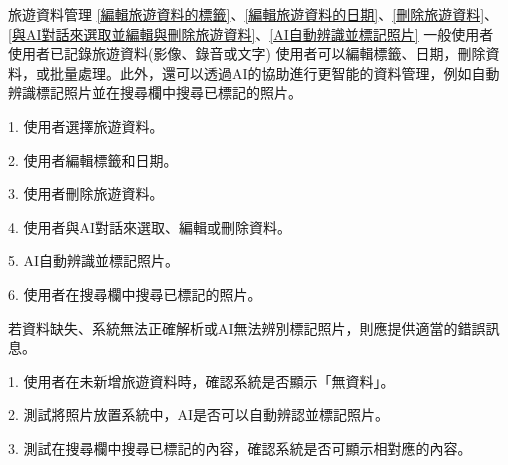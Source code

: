 \addUsecase
  {旅遊資料管理}
  {\ref{編輯旅遊資料的標籤}、\ref{編輯旅遊資料的日期}、\ref{刪除旅遊資料}、\ref{與AI對話來選取並編輯與刪除旅遊資料}、\ref{AI自動辨識並標記照片}}
  {一般使用者}
  {使用者已記錄旅遊資料(影像、錄音或文字)}
  {使用者可以編輯標籤、日期，刪除資料，或批量處理。此外，還可以透過AI的協助進行更智能的資料管理，例如自動辨識標記照片並在搜尋欄中搜尋已標記的照片。}
  {
    1. 使用者選擇旅遊資料。

    2. 使用者編輯標籤和日期。

    3. 使用者刪除旅遊資料。

    4. 使用者與AI對話來選取、編輯或刪除資料。

    5. AI自動辨識並標記照片。

    6. 使用者在搜尋欄中搜尋已標記的照片。
  }
  {若資料缺失、系統無法正確解析或AI無法辨別標記照片，則應提供適當的錯誤訊息。}
  {
    1. 使用者在未新增旅遊資料時，確認系統是否顯示「無資料」。

    2. 測試將照片放置系統中，AI是否可以自動辨認並標記照片。

    3. 測試在搜尋欄中搜尋已標記的內容，確認系統是否可顯示相對應的內容。
  }

\usecaseTable

